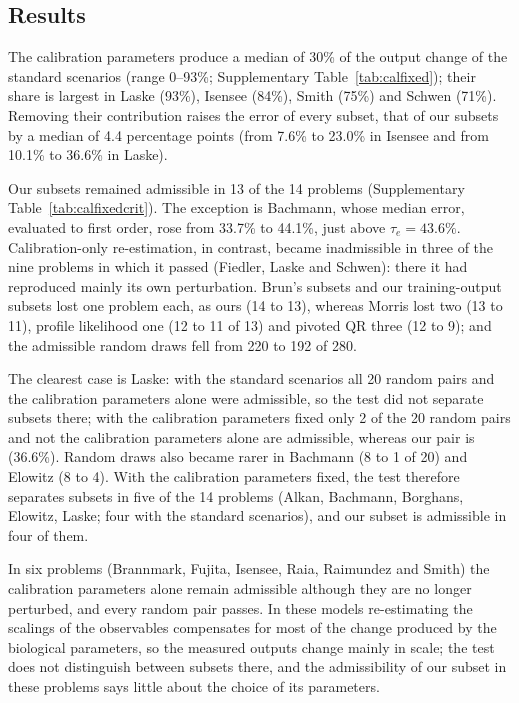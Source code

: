 \subsection*{Results}
The calibration parameters produce a median of 30\% of the output change of the standard scenarios (range 0--93\%; Supplementary Table~\ref{tab:calfixed}); their share is largest in Laske (93\%), Isensee (84\%), Smith (75\%) and Schwen (71\%). Removing their contribution raises the error of every subset, that of our subsets by a median of 4.4 percentage points (from 7.6\% to 23.0\% in Isensee and from 10.1\% to 36.6\% in Laske).

Our subsets remained admissible in 13 of the 14 problems (Supplementary Table~\ref{tab:calfixedcrit}). The exception is Bachmann, whose median error, evaluated to first order, rose from 33.7\% to 44.1\%, just above $\tau_e=43.6\%$. Calibration-only re-estimation, in contrast, became inadmissible in three of the nine problems in which it passed (Fiedler, Laske and Schwen): there it had reproduced mainly its own perturbation. Brun's subsets and our training-output subsets lost one problem each, as ours (14 to 13), whereas Morris lost two (13 to 11), profile likelihood one (12 to 11 of 13) and pivoted QR three (12 to 9); and the admissible random draws fell from 220 to 192 of 280.

The clearest case is Laske: with the standard scenarios all 20 random pairs and the calibration parameters alone were admissible, so the test did not separate subsets there; with the calibration parameters fixed only 2 of the 20 random pairs and not the calibration parameters alone are admissible, whereas our pair is (36.6\%). Random draws also became rarer in Bachmann (8 to 1 of 20) and Elowitz (8 to 4). With the calibration parameters fixed, the test therefore separates subsets in five of the 14 problems (Alkan, Bachmann, Borghans, Elowitz, Laske; four with the standard scenarios), and our subset is admissible in four of them.

In six problems (Brannmark, Fujita, Isensee, Raia, Raimundez and Smith) the calibration parameters alone remain admissible although they are no longer perturbed, and every random pair passes. In these models re-estimating the scalings of the observables compensates for most of the change produced by the biological parameters, so the measured outputs change mainly in scale; the test does not distinguish between subsets there, and the admissibility of our subset in these problems says little about the choice of its parameters.

